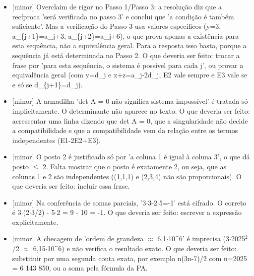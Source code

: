 \documentclass{article}%
\begin{document}
\begin{itemize}%
\item%
{[}minor{]} Overclaim de rigor no Passo 1/Passo 3: a resolução diz que a recíproca 'será verificada no passo 3' e conclui que 'a condição é também suficiente'. Mas a verificação do Passo 3 usa valores específicos (y=3, a\_\{j+1\}=a\_j+3, a\_\{j+2\}=a\_j+6), o que prova apenas a existência para esta sequência, não a equivalência geral. Para a resposta isso basta, porque a sequência já está determinada no Passo 2. O que deveria ser feito: trocar a frase por 'para esta sequência, o sistema é possível para cada j', ou provar a equivalência geral (com y=d\_j e x+z=a\_j-2d\_j, E2 vale sempre e E3 vale se e só se d\_\{j+1\}=d\_j).%
\item%
{[}minor{]} A armadilha 'det A = 0 não significa sistema impossível' é tratada só implicitamente. O determinante não aparece no texto. O que deveria ser feito: acrescentar uma linha dizendo que det A = 0, que a singularidade não decide a compatibilidade e que a compatibilidade vem da relação entre os termos independentes (E1-2E2+E3).%
\item%
{[}minor{]} O posto 2 é justificado só por 'a coluna 1 é igual à coluna 3', o que dá posto $\leq$ 2. Falta mostrar que o posto é exatamente 2, ou seja, que as colunas 1 e 2 são independentes ((1,1,1) e (2,3,4) não são proporcionais). O que deveria ser feito: incluir essa frase.%
\item%
{[}minor{]} Na conferência de somas parciais, '3$\cdot$3-2$\cdot$5=-1' está cifrado. O correto é 3$\cdot$(2$\cdot$3/2) - 5$\cdot$2 = 9 - 10 = -1. O que deveria ser feito: escrever a expressão explicitamente.%
\item%
{[}minor{]} A checagem de 'ordem de grandeza $\approx$ 6,1$\cdot$10\^{}6' é imprecisa (3$\cdot$2025$^2$/2 $\approx$ 6,15$\cdot$10\^{}6) e não verifica o resultado exato. O que deveria ser feito: substituir por uma segunda conta exata, por exemplo n(3n-7)/2 com n=2025 = 6 143 850, ou a soma pela fórmula da PA.%
\end{itemize}%
\end{document}
